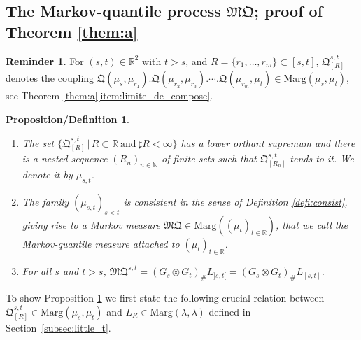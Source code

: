 \documentclass[11pt]{article}
\newcommand{\Subsection}{\subsection}
\newcommand{\skpt}{\smallskip}
\theoremstyle{plain}
\newtheorem{prodefinition}[them]{Proposition/Definition}
\theoremstyle{definition}
\newtheorem{reminder}[them]{Reminder}
\newcommand{\como}{\mathfrak{Q}}
\newcommand{\mq}{\mathfrak{MQ}}
\newcommand{\la}{\lambda}
\newcommand{\ma}{\mathrm{Marg}}
\newcommand{\R}{\mathbb{R}}
\newcommand{\N}{\mathbb{N}}
\begin{document}
\Subsection{The Markov-quantile process $\mq$; proof of Theorem \ref{them:a}}\label{subsec:preuve_premier}

\begin{reminder} For $(s,t)\in\R^2$ with $t>s$, and $R=\{r_1,\ldots,r_m\}\subset[s,t]$, $\como^{s,t}_{[R]}$ denotes the coupling $\como(\mu_{s},\mu_{r_1}).\como(\mu_{r_2},\mu_{r_3}).\cdots.\como(\mu_{r_{m}},\mu_{t})\in\ma(\mu_s,\mu_t)$, see Theorem \ref{them:a}\eqref{item:limite_de_compose}.
\end{reminder}

\skpt
\begin{prodefinition}\label{pro:comp_conv}
\begin{enumerate}
\item
\label{aaa} The set $\{\como^{s,t}_{[R]}\,|\,R\subset \R\ \text{and}\ \sharp R<\infty\}$ has a lower orthant supremum and there is a nested sequence $(R_n)_{n\in \N}$ of finite sets such that $\como^{s,t}_{[R_n]}$ tends to it. We denote it by $\mu_{s,t}$.

\item
\label{bbb} The family $(\mu_{s,t})_{s<t}$ is consistent in the sense of Definition \ref{defi:consist}, giving rise to a Markov measure $\mq\in\ma((\mu_t)_{t\in\R})$, that we call the \emph{Markov-quantile measure} attached to $(\mu_t)_{t\in\R}$.

\item
\label{ccc} For all $s$ and $t>s$, $\mq^{s,t}=(G_s\otimes G_t)_\#L_{]s,t[}=(G_s\otimes G_t)_\#L_{[s,t]}$.
\end{enumerate}
\end{prodefinition}

To show Proposition \ref{pro:comp_conv} we first state the following crucial relation between $\como^{s,t}_{[R]}\in \ma(\mu_s,\mu_t)$ and $L_R\in \ma(\la,\la)$ defined in Section~\ref{subsec:little_t}.
\end{document}

